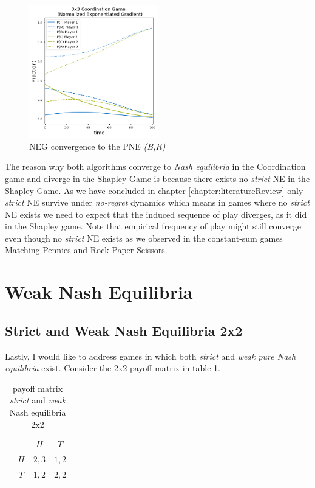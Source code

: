 \begin{figure}[H]
    \centering
    \includegraphics[width=0.5\textwidth]{logos/Coordination3x3-3.png}
    \caption{NEG convergence to the PNE \textit{(B,R)}}
    \label{fig:Coordination3x3-3}
\end{figure}

The reason why both algorithms converge to \textit{Nash equilibria} in the Coordination game and diverge in the Shapley Game is because there exists no \textit{strict} NE in the Shapley Game. As we have concluded in chapter \ref{chapter:literatureReview} only \textit{strict} NE survive under \textit{no-regret} dynamics which means in games where no \textit{strict} NE exists we need to expect that the induced sequence of play diverges, as it did in the Shapley game. Note that empirical frequency of play might still converge even though no \textit{strict} NE exists as we observed in the constant-sum games Matching Pennies and Rock Paper Scissors. 


\section{Weak Nash Equilibria}\label{section:WeakNashEquilibria}

\subsection{Strict and Weak Nash Equilibria 2x2}\label{subsection:2x2}

Lastly, I would like to address games in which both \textit{strict} and \textit{weak pure Nash equilibria} exist. Consider the 2x2 payoff matrix in table \ref{tab:payoffStrictAndWeak2x2}.

\begin{table}[H]\centering
\setlength{\extrarowheight}{2pt}
\begin{tabular}{cc|c|c|}
  & \multicolumn{1}{c}{} & \multicolumn{1}{c}{$H$}  & \multicolumn{1}{c}{$T$} \\\cline{3-4}
  & $H$ & $2,3$ & $1,2$ \\\cline{3-4}
  & $T$ & $1,2$ & $2,2$ \\\cline{3-4}
\end{tabular}\caption{\label{tab:payoffStrictAndWeak2x2}payoff matrix \textit{strict} and \textit{weak} Nash equilibria 2x2}
\end{table}

